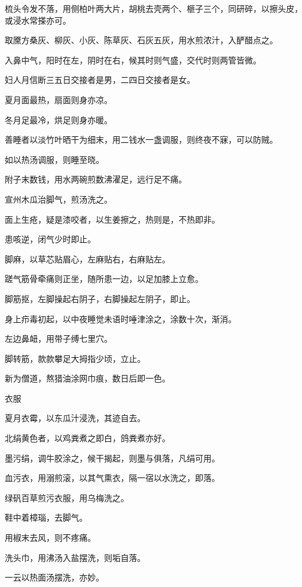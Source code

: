 \documentclass[a4paper,12pt,UTF8,twoside]{ctexbook}
\begin{document}
    梳头令发不落，用侧柏叶两大片，胡桃去壳两个、榧子三个，同研碎，以擦头皮，或浸水常搽亦可。
    
    取黡方桑灰、柳灰、小灰、陈草灰、石灰五灰，用水煎浓汁，入酽醋点之。
    
    入鼻中气，阳时在左，阴时在右，候其时则气盛，交代时则两管皆微。
    
    妇人月信断三五日交接者是男，二四日交接者是女。
    
    夏月面最热，扇面则身亦凉。
    
    冬月足最冷，烘足则身亦暖。
    
    善睡者以淡竹叶晒干为细末，用二钱水一盏调服，则终夜不寐，可以防贼。
    
    如以热汤调服，则睡至晓。
    
    附子末数钱，用水两碗煎数沸濯足，远行足不痛。
    
    宣州木瓜治脚气，煎汤洗之。
    
    面上生疮，疑是漆咬者，以生姜擦之，热则是，不热即非。
    
    患咳逆，闭气少时即止。
    
    脚麻，以草芯贴眉心，左麻贴右，右麻贴左。
    
    蹉气筋骨牵痛则正坐，随所患一边，以足加膝上立愈。
    
    脚筋抠，左脚操起右阴子，右脚操起左阴子，即止。
    
    身上疖毒初起，以中夜睡觉未语时唾津涂之，涂数十次，渐消。
    
    左边鼻衄，用带子缚七里穴。
    
    脚转筋，款款攀足大拇指少顷，立止。
    
    新为僧道，熬猎油涂网巾痕，数日后即一色。
    
    衣服
    
    夏月衣霉，以东瓜汁浸洗，其迹自去。
    
    北绢黄色者，以鸡粪煮之即白，鸽粪煮亦好。
    
    墨污绢，调牛胶涂之，候干揭起，则墨与俱落，凡绢可用。
    
    血污衣，用溺煎滚，以其气熏衣，隔一宿以水洗之，即落。
    
    绿矾百草煎污衣服，用乌梅洗之。
    
    鞋中着樟瑙，去脚气。
    
    用椒末去风，则不疼痛。
    
    洗头巾，用沸汤入盐摆洗，则垢自落。
    
    一云以热面汤摆洗，亦妙。
    
\end{document}
